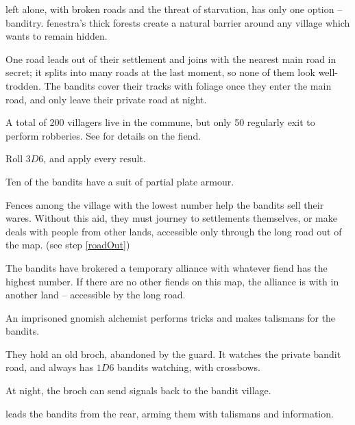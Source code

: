 \begin{multicols}{2}
 left alone, with broken roads and the threat of starvation, has only one option -- banditry.
\Gls{fenestra}'s thick forests create a natural barrier around any \gls{village} which wants to remain hidden.

One road leads out of their settlement and joins with the nearest main road in secret; it splits into many roads at the last moment, so none of them look well-trodden.
The bandits cover their tracks with foliage once they enter the main road, and only leave their private road at night.

A total of 200 villagers live in the commune, but only 50 regularly exit to perform robberies.
See  for details on the \gls{fiend}.

Roll $3D6$, and apply every result.

\begin{dlist}
  \item
  Ten of the bandits have a suit of partial plate armour.
  \item
  Fences among the \gls{village} with the lowest number help the bandits sell their wares.
  Without this aid, they must journey to settlements themselves, or make deals with people from other lands, accessible only through the long road out of the map.
  (see step \vref{roadOut})
  \item
  The bandits have brokered a temporary alliance with whatever \gls{fiend} has the highest number.
  If there are no other \glspl{fiend} on this map, the alliance is with  in another land -- accessible by the long road.
  \item
  An imprisoned gnomish alchemist performs tricks and makes \glspl{talisman} for the bandits.
  \item
  They hold an old \gls{broch}, abandoned by the \gls{guard}.
  It watches the private bandit road, and always has $1D6$ bandits watching, with crossbows.

  At night, the \gls{broch} can send signals back to the bandit \gls{village}.
  \item
   leads the bandits from the rear, arming them with \glspl{talisman} and information.
\end{dlist}


\end{multicols}
